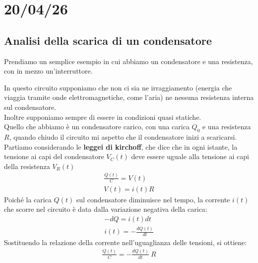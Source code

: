 \documentclass[a4paper, oneside]{article}
\begin{document}
\newpage
\section{20/04/26}
\subsection*{Analisi della scarica di un condensatore}
Prendiamo un semplice esempio in cui abbiamo un condensatore e una resistenza, con in mezzo un'interruttore.
\begin{center}
\end{center}
In questo circuito supponiamo che non ci sia ne irraggiamento (energia che viaggia tramite onde elettromagnetiche, come l'aria) ne nessuna resistenza interna sul condensatore.\\
Inoltre supponiamo sempre di essere in condizioni quasi statiche.\\
Quello che abbiamo è un condensatore carico, con una carica $Q_0$ e una resistenza $R$, quando chiudo il circuito mi aspetto che il condensatore inizi a scaricarsi.\\
Partiamo considerando le \textbf{leggei di kirchoff}, che dice che in ogni istante, la tensione ai capi del condensatore $V_C(t)$ deve essere uguale alla tensione ai capi della resistenza $V_R(t)$
\begin{gather*}
    \frac{Q(t)}{C} = V(t)\\
    V(t) = i(t) R
\end{gather*}
Poiché la carica $Q(t)$ sul condensatore diminuisce nel tempo, la corrente $i(t)$ che scorre nel circuito è data dalla variazione negativa della carica:
\begin{gather*}
    -dQ = i(t) dt\\
    i(t) = - \frac{dQ(t)}{dt}
\end{gather*}
Sostituendo la relazione della corrente nell'uguaglianza delle tensioni, si ottiene:
\begin{gather*}
    \frac{Q(t)}{C} = -\frac{dQ(t)}{dt} \ R
\end{gather*}
\end{document}
